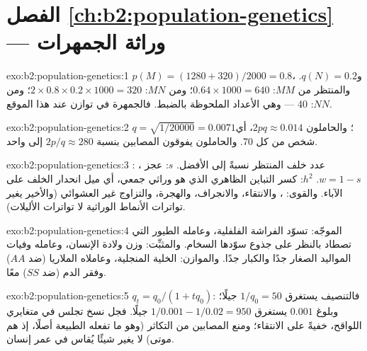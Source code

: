\section*{الفصل \ref{ch:b2:population-genetics} --- وراثة الجمهرات}

\begin{solution}{exo:b2:population-genetics:1}
$p(M) = (1280 + 320)/2000 = 0.8$، و$q(N) = 0.2$. والمنتظر من $MM$:
$0.64\times 1000 = 640$؛ ومن $MN$: $2\times 0.8\times 0.2\times 1000 =
320$؛ ومن $NN$: 40 --- وهي الأعداد الملحوظة بالضبط. فالجمهرة
في توازن عند هذا الموقع.
\end{solution}

\begin{solution}{exo:b2:population-genetics:2}
$q = \sqrt{1/20000} = 0.0071$؛ والحاملون $2pq \approx 0.014$، أي شخص
من كل 70. والحاملون يفوقون المصابين بنسبة $2p/q \approx
280$ إلى واحد.
\end{solution}

\begin{solution}{exo:b2:population-genetics:3}
: عدد خلف  المنتظر نسبةً إلى
الأفضل.  $s$: عجز ، $w = 1 -
s$.  $h^{2}$: كسر التباين الظاهري
الذي هو وراثي جمعي، أي ميل انحدار الخلف على
الآباء. والقوى: ، والانتقاء، والانجراف، والهجرة، والتزاوج
غير العشوائي (والأخير يغير تواترات الأنماط الوراثية لا تواترات الأليلات).
\end{solution}

\begin{solution}{exo:b2:population-genetics:4}
الموجّه: تسوّد الفراشة الفلفلية، وعامله الطيور التي تصطاد
بالنظر على جذوع سوّدها السخام. والمثبِّت: وزن ولادة الإنسان،
وعامله وفيات المواليد الصغار جدًا والكبار جدًا. والموازن:
الخلية المنجلية، وعاملاه الملاريا (ضد $AA$) وفقر الدم (ضد
$SS$) معًا.
\end{solution}

\begin{solution}{exo:b2:population-genetics:5}
$q_t = q_0/(1 + tq_0)$: فالتنصيف يستغرق $1/q_0 = 50$ جيلًا؛
وبلوغ $0.001$ يستغرق $1/0.001 - 1/0.02 = 950$ جيلًا. فجل
نسخ  تجلس في متغايري اللواقح، خفيةً على
الانتقاء؛ ومنع المصابين من التكاثر (وهو ما تفعله الطبيعة
أصلًا، إذ هم موتى) لا يغير شيئًا يُقاس في
عمر إنسان.
\end{solution}

